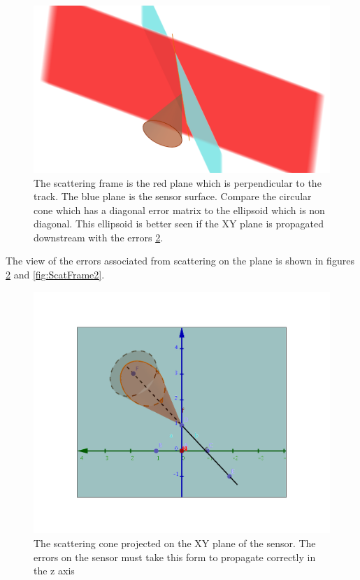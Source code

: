 \begin{figure}[H]
\centering
\includegraphics[width=1.0\linewidth]{figures/propGood600.png}
\caption{The scattering frame is the red plane which is perpendicular to the track. The blue plane is the sensor surface. Compare the circular cone which has a diagonal error matrix to the ellipsoid which is non diagonal. This ellipsoid is better seen if the XY plane is propagated downstream with the errors \ref{fig:ScatFrame1}.}
\label{fig:ScatFrame}
\end{figure}

The view of the errors associated from scattering on the plane is shown in figures \ref{fig:ScatFrame1} and \ref{fig:ScatFrame2}. 

\begin{figure}[H]
\centering
\includegraphics[width=1.0\linewidth]{figures/scatterDownZProjection.png}
\caption{The scattering cone projected on the XY plane of the sensor. The errors on the sensor must take this form to propagate correctly in the z axis}
\label{fig:ScatFrame1}
\end{figure}

